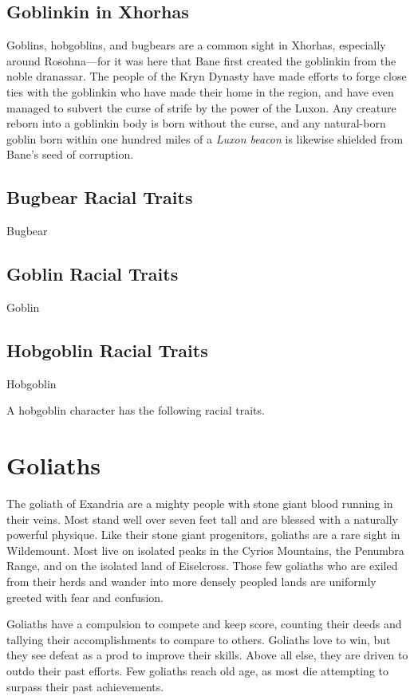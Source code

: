 \documentclass[10pt,a4paper,twoside,bg=print,twocolumn,openany,nodeprecatedcode]{dndbook}
\begin{document}
\subsection{Goblinkin in Xhorhas}
Goblins, hobgoblins, and bugbears are a common sight in Xhorhas, especially around Rosohna—for it was here that Bane first created the goblinkin from the noble dranassar. The people of the Kryn Dynasty have made efforts to forge close ties with the goblinkin who have made their home in the region, and have even managed to subvert the curse of strife by the power of the Luxon. Any creature reborn into a goblinkin body is born without the curse, and any natural-born goblin born within one hundred miles of a \textit{Luxon beacon} is likewise shielded from Bane's seed of corruption.

\subsection{Bugbear Racial Traits}
Bugbear

\subsection{Goblin Racial Traits}
Goblin

\subsection{Hobgoblin Racial Traits}
Hobgoblin

A hobgoblin character has the following racial traits.

\section{Goliaths}
The goliath of Exandria are a mighty people with stone giant blood running in their veins. Most stand well over seven feet tall and are blessed with a naturally powerful physique. Like their stone giant progenitors, goliaths are a rare sight in Wildemount. Most live on isolated peaks in the Cyrios Mountains, the Penumbra Range, and on the isolated land of Eiselcross. Those few goliaths who are exiled from their herds and wander into more densely peopled lands are uniformly greeted with fear and confusion.

Goliaths have a compulsion to compete and keep score, counting their deeds and tallying their accomplishments to compare to others. Goliaths love to win, but they see defeat as a prod to improve their skills. Above all else, they are driven to outdo their past efforts. Few goliaths reach old age, as most die attempting to surpass their past achievements.
\end{document}
